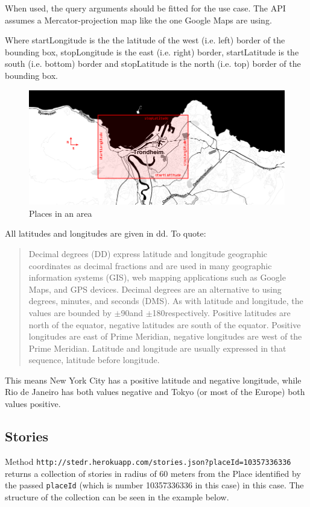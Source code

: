 \documentclass[11pt]{book}
\begin{document}
When used, the query arguments should be fitted for the use case. The API assumes a Mercator-projection map like the one Google Maps are using.

Where startLongitude is the the latitude of the west (i.e. left) border of the bounding box, stopLongitude is the east (i.e. right) border, startLatitude is the south (i.e. bottom) border and stopLatitude is the north (i.e. top) border of the bounding box.

\begin{figure}[H]
      \centering
      \includegraphics[width=1.0\textwidth]{Figures/Architecture/placesRange.png}
      \caption{Places in an area}
      \label{fig:arch_interface_map}
\end{figure}

All latitudes and longitudes are given in \gls{dd}. To quote:

\begin{quotation}\noindent
Decimal degrees (DD) express latitude and longitude geographic coordinates as decimal fractions and are used in many geographic information systems (GIS), web mapping applications such as Google Maps, and GPS devices. Decimal degrees are an alternative to using degrees, minutes, and seconds (DMS). As with latitude and longitude, the values are bounded by $\pm$90\degree and $\pm$180\degree respectively. Positive latitudes are north of the equator, negative latitudes are south of the equator. Positive longitudes are east of Prime Meridian, negative longitudes are west of the Prime Meridian. Latitude and longitude are usually expressed in that sequence, latitude before longitude.\cite{decimalDegrees}
\end{quotation}

This means New York City has a positive latitude and negative longitude, while Rio de Janeiro has both values negative and Tokyo (or most of the Europe) both values positive.

\subsection{Stories}\label{storiesjson}
Method \texttt{http://stedr.herokuapp.com/stories.json?placeId=10357336336} returns a collection of stories in radius of 60 meters from the Place identified by the passed \texttt{placeId} (which is number 10357336336 in this case) in this case. The structure of the collection can be seen in the example below.
\end{document}
